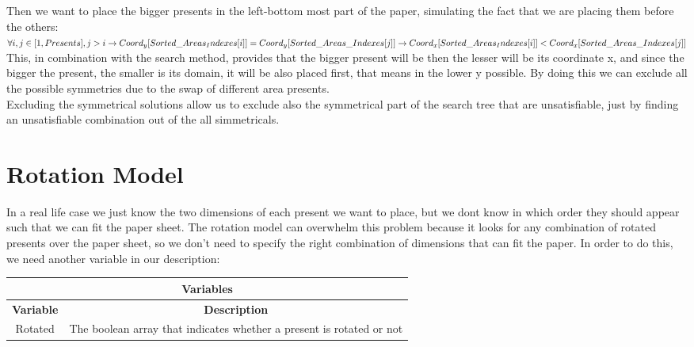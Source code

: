 Then we want to place the bigger presents in the left-bottom most part of the paper, simulating the fact that we are placing them before
the others:\\
$
\forall i, j \in [1, Presents], j > i \rightarrow \\
    Coord_y[Sorted\_Areas_Indexes[i]] = Coord_y[Sorted\_Areas\_Indexes[j]] \rightarrow \\
    Coord_x[Sorted\_Areas_Indexes[i]] < Coord_x[Sorted\_Areas\_Indexes[j]]
$
\\
This, in combination with the search method, provides that the bigger present will be then the lesser will be its coordinate x,
and since the bigger the present, the smaller is its domain, it will be also placed first, that means in the lower y possible.
By doing this we can exclude all the possible symmetries due to the swap of different area presents.\\
Excluding the symmetrical solutions allow us to exclude also the symmetrical part of the search tree that are unsatisfiable, just
by finding an unsatisfiable combination out of the all simmetricals.




\section{Rotation Model}
In a real life case we just know the two dimensions of each present we want to place, but we dont know in which order they should appear such that we can fit the paper sheet.
The rotation model can overwhelm this problem because it looks for any combination of rotated presents over the paper sheet, so we don't need to specify the right combination
of dimensions that can fit the paper. In order to do this, we need another variable in our description:

\begin{center}
		\begin{tabular}{|c|c|}
			\hline
			\multicolumn{2}{|c|}{\textbf{Variables}} \\
			\hline
			\textbf{Variable} & {\textbf{Description}} \\
			\hline
			Rotated & The boolean array that indicates whether a present is rotated or not \\
			\hline
		\end{tabular}
\end{center}


